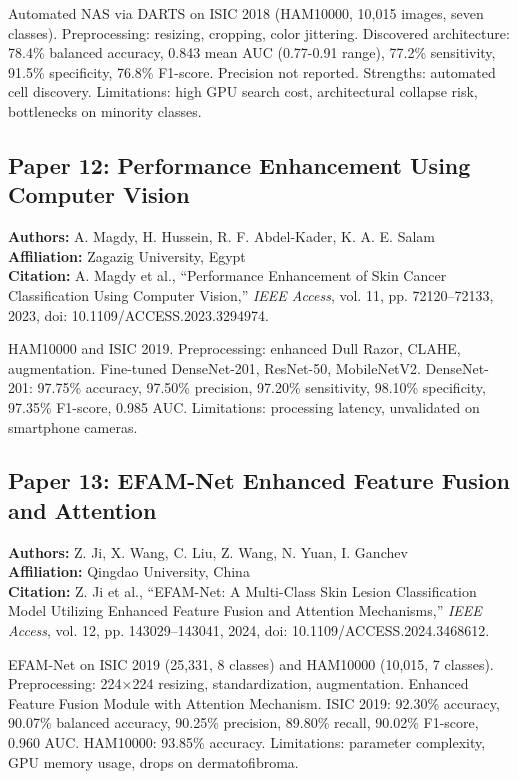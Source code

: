 \documentclass[conference]{IEEEtran}
\begin{document}
Automated NAS via DARTS on ISIC 2018 (HAM10000, 10,015 images, seven classes). Preprocessing: resizing, cropping, color jittering. Discovered architecture: 78.4\% balanced accuracy, 0.843 mean AUC (0.77-0.91 range), 77.2\% sensitivity, 91.5\% specificity, 76.8\% F1-score. Precision not reported. Strengths: automated cell discovery. Limitations: high GPU search cost, architectural collapse risk, bottlenecks on minority classes.

\subsection{Paper 12: Performance Enhancement Using Computer Vision}

\noindent\textbf{Authors:} A. Magdy, H. Hussein, R. F. Abdel-Kader, K. A. E. Salam\\
\textbf{Affiliation:} Zagazig University, Egypt\\
\textbf{Citation:} A. Magdy et al., ``Performance Enhancement of Skin Cancer Classification Using Computer Vision,'' \textit{IEEE Access}, vol. 11, pp. 72120--72133, 2023, doi: 10.1109/ACCESS.2023.3294974.

HAM10000 and ISIC 2019. Preprocessing: enhanced Dull Razor, CLAHE, augmentation. Fine-tuned DenseNet-201, ResNet-50, MobileNetV2. DenseNet-201: 97.75\% accuracy, 97.50\% precision, 97.20\% sensitivity, 98.10\% specificity, 97.35\% F1-score, 0.985 AUC. Limitations: processing latency, unvalidated on smartphone cameras.

\subsection{Paper 13: EFAM-Net Enhanced Feature Fusion and Attention}

\noindent\textbf{Authors:} Z. Ji, X. Wang, C. Liu, Z. Wang, N. Yuan, I. Ganchev\\
\textbf{Affiliation:} Qingdao University, China\\
\textbf{Citation:} Z. Ji et al., ``EFAM-Net: A Multi-Class Skin Lesion Classification Model Utilizing Enhanced Feature Fusion and Attention Mechanisms,'' \textit{IEEE Access}, vol. 12, pp. 143029--143041, 2024, doi: 10.1109/ACCESS.2024.3468612.

EFAM-Net on ISIC 2019 (25,331, 8 classes) and HAM10000 (10,015, 7 classes). Preprocessing: 224×224 resizing, standardization, augmentation. Enhanced Feature Fusion Module with Attention Mechanism. ISIC 2019: 92.30\% accuracy, 90.07\% balanced accuracy, 90.25\% precision, 89.80\% recall, 90.02\% F1-score, 0.960 AUC. HAM10000: 93.85\% accuracy. Limitations: parameter complexity, GPU memory usage, drops on dermatofibroma.
\end{document}
